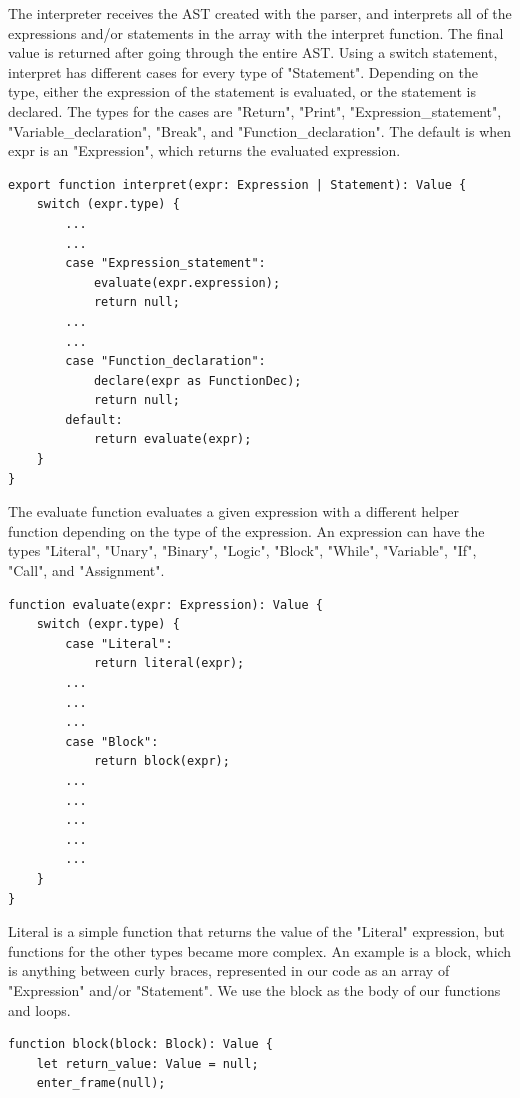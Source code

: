 \documentclass[12pt,a4paper]{article}
\begin{document}
The interpreter receives the AST created with the parser, and interprets all of the expressions and/or statements in the array with the interpret function. The final value is returned after going through the entire AST. Using a switch statement, interpret has different cases for every type of "Statement". Depending on the type, either the expression of the statement is evaluated, or the statement is declared. The types for the cases are "Return", "Print", "Expression_statement", "Variable_declaration", "Break", and "Function_declaration". The default is when expr is an "Expression", which returns the evaluated expression.

\newpage

\begin{lstlisting}[title = Shortened example of interpret]
export function interpret(expr: Expression | Statement): Value { 
    switch (expr.type) {
        ...
        ...
        case "Expression_statement":
            evaluate(expr.expression);
            return null;
        ...
        ...
        case "Function_declaration":
            declare(expr as FunctionDec);
            return null;
        default:
            return evaluate(expr);
    }
}
\end{lstlisting}

The evaluate function evaluates a given expression with a different helper function depending on the type of the expression. An expression can have the types "Literal", "Unary", "Binary", "Logic", "Block", "While", "Variable", "If", "Call", and "Assignment".

\begin{lstlisting}[title = Shortened example of evaluate]
function evaluate(expr: Expression): Value {
    switch (expr.type) {
        case "Literal":
            return literal(expr);
        ...
        ...
        ...
        case "Block":
            return block(expr);
        ...
        ...
        ...
        ...
        ...
    }
}
\end{lstlisting}

Literal is a simple function that returns the value of the "Literal" expression, but functions for the other types became more complex. An example is a block, which is anything between curly braces, represented in our code as an array of "Expression" and/or "Statement". We use the block as the body of our functions and loops.

\begin{lstlisting}[title = The block function]
function block(block: Block): Value {
    let return_value: Value = null;
    enter_frame(null);
\end{lstlisting}
\end{document}

